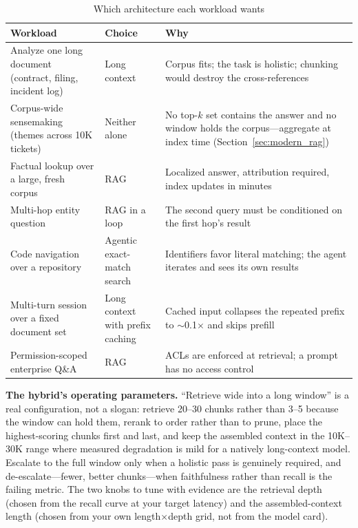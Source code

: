 \begin{table}[H]
\centering
\caption{Which architecture each workload wants}
\begin{tabularx}{\textwidth}{lXX}
\toprule
\textbf{Workload} & \textbf{Choice} & \textbf{Why} \\
\midrule
Analyze one long document (contract, filing, incident log) & Long context & Corpus fits; the task is holistic; chunking would destroy the cross-references \\
Corpus-wide sensemaking (themes across 10K tickets) & Neither alone & No top-$k$ set contains the answer and no window holds the corpus---aggregate at index time (Section~\ref{sec:modern_rag}) \\
Factual lookup over a large, fresh corpus & RAG & Localized answer, attribution required, index updates in minutes \\
Multi-hop entity question & RAG in a loop & The second query must be conditioned on the first hop's result \\
Code navigation over a repository & Agentic exact-match search & Identifiers favor literal matching; the agent iterates and sees its own results \\
Multi-turn session over a fixed document set & Long context with prefix caching & Cached input collapses the repeated prefix to $\sim$0.1$\times$ and skips prefill \\
Permission-scoped enterprise Q\&A & RAG & ACLs are enforced at retrieval; a prompt has no access control \\
\bottomrule
\end{tabularx}
\end{table}

\textbf{The hybrid's operating parameters.} ``Retrieve wide into a long window'' is a real configuration, not a slogan: retrieve 20--30 chunks rather than 3--5 because the window can hold them, rerank to order rather than to prune, place the highest-scoring chunks first and last, and keep the assembled context in the 10K--30K range where measured degradation is mild for a natively long-context model. Escalate to the full window only when a holistic pass is genuinely required, and de-escalate---fewer, better chunks---when faithfulness rather than recall is the failing metric. The two knobs to tune with evidence are the retrieval depth (chosen from the recall curve at your target latency) and the assembled-context length (chosen from your own length$\times$depth grid, not from the model card).

